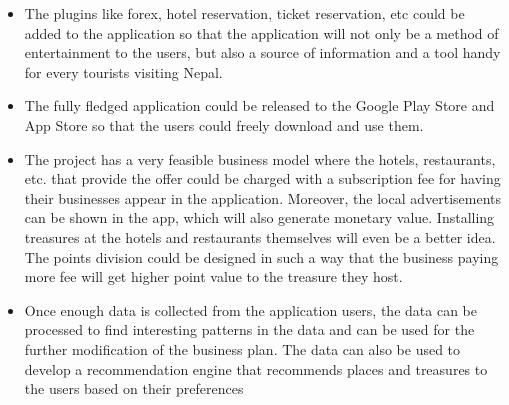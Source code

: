 \documentclass[12pt, a4paper, oneside]{article}
\begin{document}
\begin{itemize}
\item The plugins like forex, hotel reservation, ticket reservation, etc could be added to the application so that the application will not only be a method of entertainment to the users, but also a source of information and a tool handy for every tourists visiting Nepal.
\item The fully fledged application could be released to the Google Play Store and App Store so that the users could freely download and use them.
\item The project has a very feasible business model where the hotels, restaurants, etc. that provide the offer could be charged with a subscription fee for having their businesses appear in the application. Moreover, the local advertisements can be shown in the app, which will also generate monetary value. Installing treasures at the hotels and restaurants themselves will even be a better idea. The points division could be designed in such a way that the business paying more fee will get higher point value to the treasure they host.
\item Once enough data is collected from the application users, the data can be processed to find interesting patterns in the data and can be used for the further modification of the business plan. The data can also be used to develop a recommendation engine that recommends places and treasures to the users based on their preferences
\end{itemize}


\break
{}



\break
{}
\end{document}
